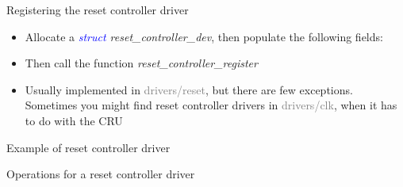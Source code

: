 \documentclass{beamer}
\begin{document}
\begin{frame}{Registering the reset controller driver}
	\begin{itemize}
		\item Allocate a \textit{\textcolor{blue}{struct} reset\_controller\_dev}, then populate the following fields:
		
		\item Then call the function \textit{reset\_controller\_register}
		\item Usually implemented in \textcolor{gray}{drivers/reset}, but there are few exceptions. Sometimes you might find reset controller drivers in \textcolor{gray}{drivers/clk}, when it has to do with the CRU
	\end{itemize}
\end{frame}

\begin{frame}{Example of reset controller driver}
	
\end{frame}

\begin{frame}{Operations for a reset controller driver}
	
\end{frame}
\end{document}
